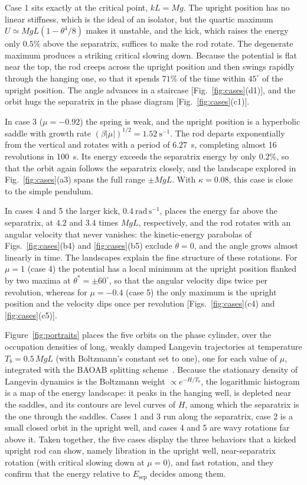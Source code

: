 Case 1 sits exactly at the critical point, $kL=Mg$. The upright position has no linear stiffness, which is the ideal of an isolator, but the quartic maximum $U\simeq MgL(1-\theta^{4}/8)$ makes it unstable, and the kick, which raises the energy only $0.5\%$ above the separatrix, suffices to make the rod rotate. The degenerate maximum produces a striking critical slowing down. Because the potential is flat near the top, the rod creeps across the upright position and then swings rapidly through the hanging one, so that it spends $71\%$ of the time within $45^{\circ}$ of the upright position. The angle advances in a staircase [Fig.~\ref{fig:cases}(d1)], and the orbit hugs the separatrix in the phase diagram [Fig.~\ref{fig:cases}(c1)].

In case 3 ($\mu=-0.92$) the spring is weak, and the upright position is a hyperbolic saddle with growth rate $(\beta|\mu|)^{1/2}=1.52\ \mathrm{s^{-1}}$. The rod departs exponentially from the vertical and rotates with a period of $6.27$~s, completing almost 16 revolutions in 100~s. Its energy exceeds the separatrix energy by only $0.2\%$, so that the orbit again follows the separatrix closely, and the landscape explored in Fig.~\ref{fig:cases}(a3) spans the full range $\pm MgL$. With $\kappa=0.08$, this case is close to the simple pendulum.

In cases 4 and 5 the larger kick, $0.4\ \mathrm{rad\,s^{-1}}$, places the energy far above the separatrix, at $4.2$ and $3.4$ times $MgL$, respectively, and the rod rotates with an angular velocity that never vanishes: the kinetic-energy parabolas of Figs.~\ref{fig:cases}(b4) and \ref{fig:cases}(b5) exclude $\dot\theta=0$, and the angle grows almost linearly in time. The landscapes explain the fine structure of these rotations. For $\mu=1$ (case 4) the potential has a local minimum at the upright position flanked by two maxima at $\theta^{*}=\pm60^{\circ}$, so that the angular velocity dips twice per revolution, whereas for $\mu=-0.4$ (case 5) the only maximum is the upright position and the velocity dips once per revolution [Figs.~\ref{fig:cases}(c4) and \ref{fig:cases}(c5)].

Figure~\ref{fig:portraits} places the five orbits on the phase cylinder, over the occupation densities of long, weakly damped Langevin trajectories at temperature $T_b=0.5\,MgL$ (with Boltzmann's constant set to one), one for each value of $\mu$, integrated with the BAOAB splitting scheme~\cite{LeimkuhlerMatthews2013}. Because the stationary density of Langevin dynamics is the Boltzmann weight $\propto e^{-H/T_b}$, the logarithmic histogram is a map of the energy landscape: it peaks in the hanging well, is depleted near the saddles, and its contours are level curves of $H$, among which the separatrix is the one through the saddles. Cases 1 and 3 run along the separatrix, case 2 is a small closed orbit in the upright well, and cases 4 and 5 are wavy rotations far above it. Taken together, the five cases display the three behaviors that a kicked upright rod can show, namely libration in the upright well, near-separatrix rotation (with critical slowing down at $\mu=0$), and fast rotation, and they confirm that the energy relative to $E_{\mathrm{sep}}$ decides among them.

